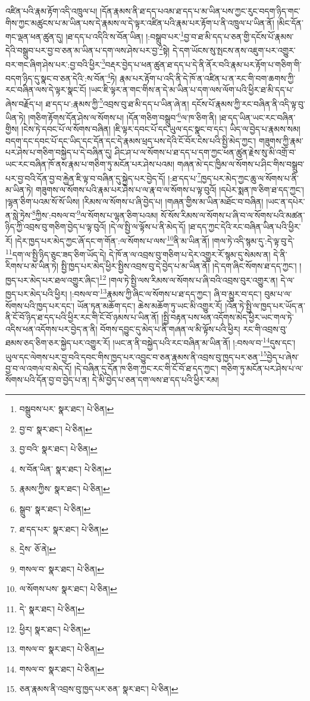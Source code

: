 འཛིན་པའི་རྣམ་རྟོག་འདི་འཁྲུལ་པ། །དོན་རྣམས་ནི་ཐ་དད་པའམ་ཐ་དད་པ་མ་ཡིན་པས་ཀྱང་རུང་བདག་ཉིད་གང་གིས་ཀྱང་མཚུངས་པ་མ་ཡིན་པས་དེ་རྣམས་ལ་དེ་ལྟར་འཛིན་པའི་རྣམ་པར་རྟོག་པ་ནི་འཁྲུལ་པ་ཡིན་ནོ། །མིང་དོན་གང་ལྡན་ཕན་ཚུན་དུ། །ཐ་དད་པ་འདིའི་ས་བོན་ཡིན། །:བསྒྲུབ་པར་\footnote{བསྒྲུབས་པར་  སྣར་ཐང་།  པེ་ཅིན། }བྱ་བ་ཐ་མི་དད་པ་ཅན་གྱི་དངོས་པོ་རྣམས་དེའི་བསྒྲུབ་པར་བྱ་བ་ཅན་མ་ཡིན་པ་དག་ལས་ཤེས་པར་བྱ་\footnote{བྱ་བ་  སྣར་ཐང་།  པེ་ཅིན། }སྟེ། དེ་དག་ཡོངས་སུ་སྤངས་ནས་འཇུག་པར་འགྱུར་བར་གང་ཞིག་ཤེས་པར་:བྱ་བའི་ཕྱིར་\footnote{བྱ་བའི་  སྣར་ཐང་།  པེ་ཅིན། }བརྡར་བྱེད་པ་ཕན་ཚུན་ཐ་དད་པ་དེ་ནི་ནོར་བའི་རྣམ་པར་རྟོག་པ་གཅིག་གི་བདག་ཉིད་དུ་སྣང་བ་ཅན་དེའི་:ས་བོན་\footnote{ས་བོན་ཡིན་  སྣར་ཐང་།  པེ་ཅིན། }ཏེ། རྣམ་པར་རྟོག་པ་འདི་ནི་དེ་ཁོ་ན་འཛིན་པ་ན་རང་གི་བག་ཆགས་ཀྱི་རང་བཞིན་ལས་དེ་ལྟར་སྣང་ངོ། །ཡང་ཇི་ལྟར་ན་གང་གིས་ན་དེ་མ་ཡིན་པ་དག་ལས་ལོག་པའི་ཕྱིར་ཐ་མི་དད་པ་ཞེས་བརྗོད་པ། ཐ་དད་པ་:རྣམས་ཀྱི་\footnote{རྣམས་ཀྱིས་  སྣར་ཐང་།  པེ་ཅིན། }འབྲས་བུ་ཐ་མི་དད་པ་ཡིན་ཞེ་ན། དངོས་པོ་རྣམས་ཀྱི་རང་བཞིན་ནི་འདི་ལྟ་བུ་ཡིན་ཏེ། །གཅིག་རྟོགས་དོན་ཤེས་ལ་སོགས་པ། །དོན་གཅིག་བསྒྲུབ་\footnote{སྒྲུབ་  སྣར་ཐང་།  པེ་ཅིན། }ལ་ཁ་ཅིག་ནི། །ཐ་དད་ཡིན་ཡང་རང་བཞིན་གྱིས། །ངེས་ཏེ་དབང་པོ་ལ་སོགས་བཞིན། །ཇི་ལྟར་དབང་པོ་དང་ཡུལ་དང་སྣང་བ་དང་། ཡིད་ལ་བྱེད་པ་རྣམས་སམ། བདག་དང་དབང་པོ་དང་ཡིད་དང་དོན་དང་དེ་རྣམས་ཕྲད་པས་དེའི་ངོ་བོར་ངེས་པའི་སྤྱི་མེད་ཀྱང་། གཟུགས་ཀྱི་རྣམ་པར་ཤེས་པ་གཅིག་བསྐྱེད་པ་དེ་བཞིན་དུ། ཤིང་ཤ་པ་ལ་སོགས་པ་ཐ་དད་པ་དག་ཀྱང་ཕན་ཚུན་རྗེས་སུ་མི་འགྲོ་བ་ཡང་རང་བཞིན་ཁོ་ནས་རྣམ་པ་གཅིག་ཏུ་མངོན་པར་ཤེས་པའམ། གཞན་མེ་དང་ཁྱིམ་ལ་སོགས་པ་ཤིང་གིས་བསྒྲུབ་པར་བྱ་བའི་དོན་བྱ་བ་རྐྱེན་ཇི་ལྟ་བ་བཞིན་དུ་སྐྱེད་པར་བྱེད་དོ། །:ཐ་དད་པ་\footnote{ཐ་དད་པར་  སྣར་ཐང་།  པེ་ཅིན། }ཁྱད་པར་མེད་ཀྱང་ཆུ་ལ་སོགས་པ་ནི་མ་ཡིན་ཏེ། གཟུགས་ལ་སོགས་པའི་རྣམ་པར་ཤེས་པ་ལ་རྣ་བ་ལ་སོགས་པ་ལྟ་བུའོ། །དཔེར་སྨན་ཁ་ཅིག་ཐ་དད་ཀྱང་། །ལྷན་ཅིག་པའམ་སོ་སོ་ཡིས། །རིམས་ལ་སོགས་པ་ཞི་བྱེད་པ། །གཞན་གྱིས་མ་ཡིན་མཐོང་བ་བཞིན། །ཡང་ན་དཔེར་ན་སླེ་ཏྲེས་\footnote{དྲེས་  ཅོ་ནེ། }ཀྱིས་:བསལ་བ་\footnote{གསལ་བ་  སྣར་ཐང་།  པེ་ཅིན། }ལ་སོགས་པ་ལྷན་ཅིག་པའམ། སོ་སོས་རིམས་ལ་སོགས་པ་ཞི་བ་ལ་སོགས་པའི་མཚན་ཉིད་ཀྱི་འབྲས་བུ་གཅིག་བྱེད་པ་ལྟ་བུའོ། །དེ་ལ་སྤྱི་ལ་ལྟོས་པ་ནི་མེད་དོ། །ཐ་དད་ཀྱང་དེའི་རང་བཞིན་ཡིན་པའི་ཕྱིར་རོ། །དེར་ཁྱད་པར་མེད་ཀྱང་ཞོ་དང་ག་གོན་:ལ་སོགས་པ་ལས་\footnote{ལ་སོགས་པས་  སྣར་ཐང་།  པེ་ཅིན། }ནི་མ་ཡིན་ནོ། །གལ་ཏེ་འདི་སྙམ་དུ་:དེ་ལྟ་བུ་དེ་\footnote{དེ་  སྣར་ཐང་།  པེ་ཅིན། }དག་ལ་སྤྱི་ཉིད་ཅུང་ཟད་ཅིག་ཡོད་དེ། དེ་ཁོ་ན་ལ་འབྲས་བུ་གཅིག་པ་དེར་འགྱུར་རོ་སྙམ་དུ་སེམས་ན། དེ་ནི་རིགས་པ་མ་ཡིན་ཏེ། སྤྱི་ཁྱད་པར་མེད་ཕྱིར་སྤྱིས་འབྲས་བུ་དེ་བྱེད་པ་མ་ཡིན་ནོ། །དེ་དག་ཞིང་སོགས་ཐ་དད་ཀྱང་། །ཁྱད་པར་མེད་པར་ཐལ་འགྱུར་ཞིང་།\footnote{ཕྱིར།  སྣར་ཐང་།  པེ་ཅིན། } །གལ་ཏེ་སྤྱི་ལས་རིམས་ལ་སོགས་པ་ཞི་བའི་འབྲས་བུར་འགྱུར་ན། དེ་ལ་ཁྱད་པར་མེད་པའི་ཕྱིར། །:བསལ་བ་\footnote{གསལ་བ་  སྣར་ཐང་།  པེ་ཅིན། }རྣམས་ཀྱི་ཞིང་ལ་སོགས་པ་ཐ་དད་ཀྱང་། ཞི་བ་མྱུར་བ་དང་། བུམ་པ་ལ་སོགས་པའི་ཁྱད་པར་དང་། ཡོན་ཏན་མཆོག་དང་། ཆེས་མཆོག་ཏུ་ཡང་མི་འགྱུར་རོ། །འོན་ཏེ་སྤྱི་ལ་ཁྱད་པར་ཡོད་ན་ནི་ངོ་བོ་ཉིད་ཐ་དད་པའི་ཕྱིར་རང་གི་ངོ་བོ་ཉམས་པ་ཡིན་ནོ། །སྤྱི་བརྟན་པས་ཕན་འདོགས་མེད་ཕྱིར་ཡང་གལ་ཏེ་འདིས་ཕན་འདོགས་པར་བྱེད་ན་ནི། བོགས་དབྱུང་དུ་མེད་པ་ནི་གཞན་ལ་མི་ལྟོས་པའི་ཕྱིར། རང་གི་འབྲས་བུ་ཐམས་ཅད་ཅིག་ཅར་སྐྱེད་པར་འགྱུར་རོ། །ཡང་ན་ནི་བསྐྱེད་པའི་རང་བཞིན་མ་ཡིན་ནོ། །:བསལ་བ་\footnote{གསལ་བ་  སྣར་ཐང་།  པེ་ཅིན། }དུས་དང་། ཡུལ་དང་ལེགས་པར་བྱ་བའི་དབང་གིས་ཁྱད་པར་འབྱུང་བ་ཅན་རྣམས་ནི་འབྲས་བུ་ཁྱད་པར་ཅན་\footnote{ཅན་རྣམས་ནི་འབྲས་བུ་ཁྱད་པར་ཅན་  སྣར་ཐང་།  པེ་ཅིན། }བྱེད་པ་ཞེས་བྱ་བ་ལ་འགལ་བ་མེད་དོ། །དེ་བཞིན་དུ་དོན་ཁ་ཅིག་ཀྱང་རང་གི་ངོ་བོ་ཐ་དད་ཀྱང་། གཅིག་ཏུ་མངོན་པར་ཤེས་པ་ལ་སོགས་པའི་དོན་བྱ་བ་བྱེད་པ་ན། དེ་མི་བྱེད་པ་ཅན་དག་ལས་ཐ་དད་པའི་ཕྱིར་རམ། 